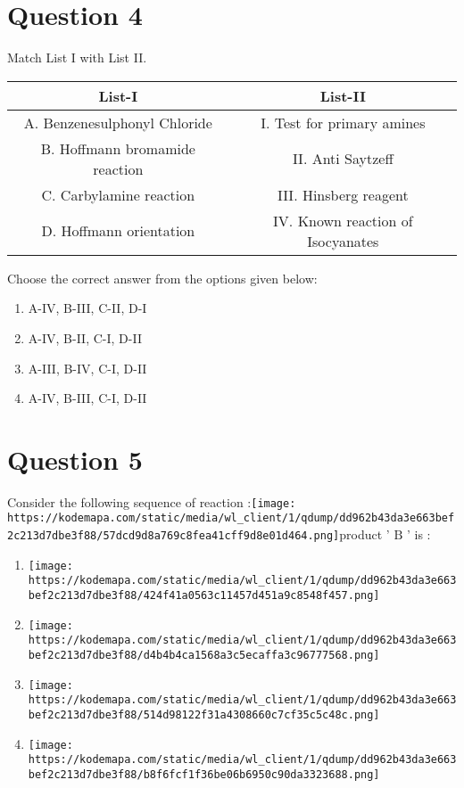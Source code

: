 \documentclass{article}
\begin{document}
\begin{enumerate}[label=(\alph*)]
\end{enumerate}
\newpage
\section*{Question 4}
Match List I with List II.\setlength{\arrayrulewidth}{0.8mm}
\begin{tabular}{|c|c|}
\hline
List-I & List-II \\
\hline
A. Benzenesulphonyl Chloride & I. Test for primary amines \\
\hline
B. Hoffmann bromamide reaction & II. Anti Saytzeff \\
\hline
C. Carbylamine reaction & III. Hinsberg reagent \\
\hline
D. Hoffmann orientation & IV. Known reaction of Isocyanates \\
\hline
\end{tabular}
\setlength{\arrayrulewidth}{0.4mm}
Choose the correct answer from the options given below: \newline
\begin{enumerate}[label=(\alph*)]
\item A-IV, B-III, C-II, D-I
\item A-IV, B-II, C-I, D-II
\item A-III, B-IV, C-I, D-II
\item A-IV, B-III, C-I, D-II
\end{enumerate}
\newpage
\section*{Question 5}
Consider the following sequence of reaction :\texttt{[image: https://kodemapa.com/static/media/wl\_client/1/qdump/dd962b43da3e663bef2c213d7dbe3f88/57dcd9d8a769c8fea41cff9d8e01d464.png]}\newlineThe product ' \(\mathrm{B}\) ' is : 
\begin{enumerate}[label=(\alph*)]
\item \texttt{[image: https://kodemapa.com/static/media/wl\_client/1/qdump/dd962b43da3e663bef2c213d7dbe3f88/424f41a0563c11457d451a9c8548f457.png]}
\item \texttt{[image: https://kodemapa.com/static/media/wl\_client/1/qdump/dd962b43da3e663bef2c213d7dbe3f88/d4b4b4ca1568a3c5ecaffa3c96777568.png]}
\item \texttt{[image: https://kodemapa.com/static/media/wl\_client/1/qdump/dd962b43da3e663bef2c213d7dbe3f88/514d98122f31a4308660c7cf35c5c48c.png]}
\item \texttt{[image: https://kodemapa.com/static/media/wl\_client/1/qdump/dd962b43da3e663bef2c213d7dbe3f88/b8f6fcf1f36be06b6950c90da3323688.png]}
\end{enumerate}
\newpage
\end{document}
